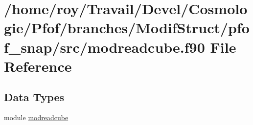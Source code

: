 \hypertarget{modreadcube_8f90}{\section{/home/roy/\-Travail/\-Devel/\-Cosmologie/\-Pfof/branches/\-Modif\-Struct/pfof\-\_\-snap/src/modreadcube.f90 File Reference}
\label{modreadcube_8f90}
}
\subsection*{Data Types}
\begin{DoxyCompactItemize}
\item 
module \hyperlink{classmodreadcube}{modreadcube}
\end{DoxyCompactItemize}
